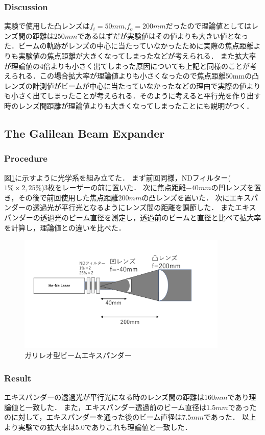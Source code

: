 \documentclass[11pt, a4paper]{jsarticle}
\begin{document}
\subsubsection{Discussion}
実験で使用した凸レンズは$f_i = 50mm$,$f_o = 200mm$だったので理論値としてはレンズ間の距離は$250mm$であるはずだが実験値はその値よりも大きい値となった．ビームの軌跡がレンズの中心に当たっていなかったために実際の焦点距離よりも実験値の焦点距離が大きくなってしまったなどが考えられる．
また拡大率が理論値の4倍よりも小さく出てしまった原因についても上記と同様のことが考えられる．この場合拡大率が理論値よりも小さくなったので焦点距離50mmの凸レンズの計測値がビームが中心に当たっていなかったなどの理由で実際の値よりも小さく出てしまったことが考えられる．そのように考えると平行光を作り出す時のレンズ間距離が理論値よりも大きくなってしまったことにも説明がつく．
\subsection{The Galilean Beam Expander}
\subsubsection{Procedure}
図\ref{fig:four}に示すように光学系を組み立てた．
まず前回同様，NDフィルター($1\%\times2,25\%$)3枚をレーザーの前に置いた．
次に焦点距離$-40mm$の凹レンズを置き，その後で前回使用した焦点距離$200mm$の凸レンズを置いた．
次にエキスパンダーの透過光が平行光となるようにレンズ間の距離を調節した．
またエキスパンダーの透過光のビーム直径を測定し，透過前のビームと直径と比べて拡大率を計算し，理論値との違いを比べた．
\begin{figure}[htbp]
 \begin{center}
  \includegraphics[width=100mm]{fig4.png}
 \end{center}
 \caption{ガリレオ型ビームエキスパンダー}
 \label{fig:four}
\end{figure}
\subsubsection{Result}
エキスパンダーの透過光が平行光になる時のレンズ間の距離は$160mm$であり理論値と一致した．
また，エキスパンダー透過前のビーム直径は$1.5mm$であったのに対して，エキスパンダーを通った後のビーム直径は$7.5mm$であった．
以上より実験での拡大率は$5.0$でありこれも理論値と一致した．
\end{document}
